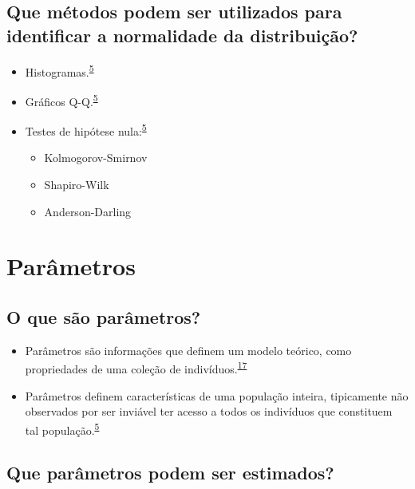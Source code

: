 \documentclass[
]{book}
\begin{document}
\hypertarget{que-muxe9todos-podem-ser-utilizados-para-identificar-a-normalidade-da-distribuiuxe7uxe3o}{%
\subsection{Que métodos podem ser utilizados para identificar a normalidade da distribuição?}\label{que-muxe9todos-podem-ser-utilizados-para-identificar-a-normalidade-da-distribuiuxe7uxe3o}}

\begin{itemize}
\item
  Histogramas.\textsuperscript{\protect\hyperlink{ref-vetter2017}{5}}
\item
  Gráficos Q-Q.\textsuperscript{\protect\hyperlink{ref-vetter2017}{5}}
\item
  Testes de hipótese nula:\textsuperscript{\protect\hyperlink{ref-vetter2017}{5}}

  \begin{itemize}
  \item
    Kolmogorov-Smirnov
  \item
    Shapiro-Wilk
  \item
    Anderson-Darling
  \end{itemize}
\end{itemize}

\hypertarget{parametros}{%
\section{Parâmetros}\label{parametros}}

\hypertarget{o-que-suxe3o-paruxe2metros}{%
\subsection{O que são parâmetros?}\label{o-que-suxe3o-paruxe2metros}}

\begin{itemize}
\item
  Parâmetros são informações que definem um modelo teórico, como propriedades de uma coleção de indivíduos.\textsuperscript{\protect\hyperlink{ref-Altman1999}{17}}
\item
  Parâmetros definem características de uma população inteira, tipicamente não observados por ser inviável ter acesso a todos os indivíduos que constituem tal população.\textsuperscript{\protect\hyperlink{ref-vetter2017}{5}}
\end{itemize}

\hypertarget{que-paruxe2metros-podem-ser-estimados}{%
\subsection{Que parâmetros podem ser estimados?}\label{que-paruxe2metros-podem-ser-estimados}}
\end{document}
